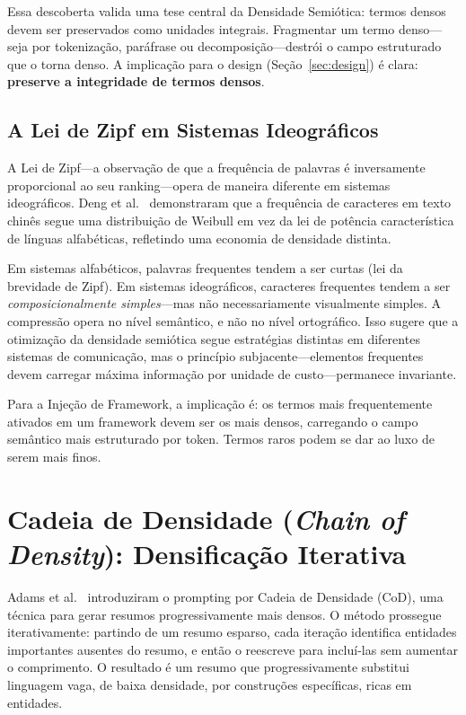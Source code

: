 \documentclass[12pt,a4paper]{article}
\begin{document}
Essa descoberta valida uma tese central da Densidade Semiótica: termos densos devem ser preservados como unidades integrais.
Fragmentar um termo denso---seja por tokenização, paráfrase ou decomposição---destrói o campo estruturado que o torna denso.
A implicação para o design (Seção~\ref{sec:design}) é clara: \textbf{preserve a integridade de termos densos}.

\subsection{A Lei de Zipf em Sistemas Ideográficos}

A Lei de Zipf---a observação de que a frequência de palavras é inversamente proporcional ao seu ranking---opera de maneira diferente em sistemas ideográficos.
Deng et al.\ \cite{deng2014} demonstraram que a frequência de caracteres em texto chinês segue uma distribuição de Weibull em vez da lei de potência característica de línguas alfabéticas, refletindo uma economia de densidade distinta.

Em sistemas alfabéticos, palavras frequentes tendem a ser curtas (lei da brevidade de Zipf).
Em sistemas ideográficos, caracteres frequentes tendem a ser \textit{composicionalmente simples}---mas não necessariamente visualmente simples.
A compressão opera no nível semântico, e não no nível ortográfico.
Isso sugere que a otimização da densidade semiótica segue estratégias distintas em diferentes sistemas de comunicação, mas o princípio subjacente---elementos frequentes devem carregar máxima informação por unidade de custo---permanece invariante.

Para a Injeção de Framework, a implicação é: os termos mais frequentemente ativados em um framework devem ser os mais densos, carregando o campo semântico mais estruturado por token.
Termos raros podem se dar ao luxo de serem mais finos.


\section{Cadeia de Densidade (\textit{Chain of Density}): Densificação Iterativa}
\label{sec:cod}

Adams et al.\ \cite{adams2023} introduziram o prompting por Cadeia de Densidade (CoD), uma técnica para gerar resumos progressivamente mais densos.
O método prossegue iterativamente: partindo de um resumo esparso, cada iteração identifica entidades importantes ausentes do resumo, e então o reescreve para incluí-las sem aumentar o comprimento.
O resultado é um resumo que progressivamente substitui linguagem vaga, de baixa densidade, por construções específicas, ricas em entidades.
\end{document}
